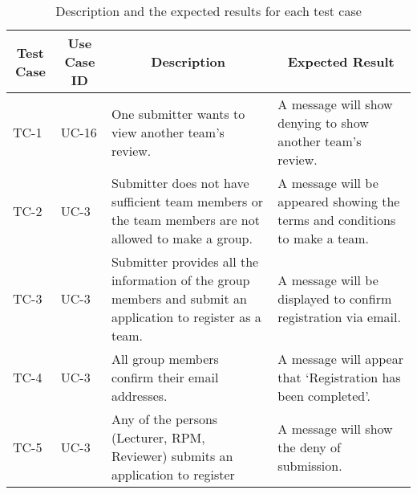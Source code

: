 \begin{center}
\begin{table}[]
\caption{Description and the expected results for each test case }
\label{my-label}
    \begin{tabular}{ | l | l | p{5cm} | p{5cm} |}
    \hline
\multicolumn{1}{|c|}{\textbf{Test Case}} & \multicolumn{1}{c|}{\textbf{Use Case ID}} & \multicolumn{1}{c|}{\textbf{Description}}                                                                    & \multicolumn{1}{c|}{\textbf{Expected Result}}                                                         \\ \hline
TC-1                                     & UC-16                                     & One submitter wants to view another team’s review.                                                           & A message will show denying to show another team's review.                                            \\ \hline
TC-2                                     & UC-3                                      & Submitter does not have sufficient team members or the team members are not allowed to make a group.         & A message will be appeared showing the terms and conditions to make a team.                           \\ \hline
TC-3                                     & UC-3                                      & Submitter provides all the information of the group members and submit an application to register as a team. & A message will be displayed to confirm registration via email.                                        \\ \hline
TC-4                                     & UC-3                                      & All group members confirm their email addresses.                                                             & A message will appear that ‘Registration has been completed’.                                         \\ \hline

TC-5                                     & UC-3                                      & Any of the persons (Lecturer, RPM, Reviewer) submits an application to register                              & A message will show the deny of submission.                                                           \\ \hline



\end{tabular}
\end{table}
\end{center}

